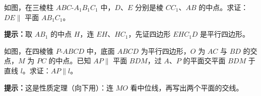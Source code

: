 \documentclass{exam-zh}
\begin{document}

\begin{problem}[points=11]
  \noindent
  \begin{minipage}[t]{\dimexpr\linewidth-60mm-6mm\relax}
    \vspace{0pt}
    如图，在三棱柱 $ABC$-$A_{1}B_{1}C_{1}$ 中，$D$、$E$ 分别是棱 $CC_{1}$、$AB$ 的中点。求证：$DE\parallel$ 平面 $AB_{1}C_{1}$。

    \begin{hintbox}
\textbf{提示：}取 $AB_{1}$ 的中点 $H$，连 $EH$、$HC_{1}$，先证四边形 $EHC_{1}D$ 是平行四边形。\end{hintbox}

  \end{minipage}\hfill
  \begin{diagramcoltikz}{60mm}{取 $H$ 为 $AB_{1}$ 中点，证 $EHC_{1}D$ 为平行四边形。}
  }
  \end{diagramcoltikz}
  \par\medskip
  \answerarea[65mm]
\end{problem}



\begin{problem}[points=11]
  \noindent
  \begin{minipage}[t]{\dimexpr\linewidth-60mm-6mm\relax}
    \vspace{0pt}
    如图，在四棱锥 $P$-$ABCD$ 中，底面 $ABCD$ 为平行四边形，$O$ 为 $AC$ 与 $BD$ 的交点，$M$ 为 $PC$ 的中点。已知 $AP\parallel$ 平面 $BDM$，过 $A$、$P$ 的平面交平面 $BDM$ 于直线 $l$。求证：$AP\parallel l$。

    \begin{hintbox}
\textbf{提示：}这是性质定理（向下用）：连 $MO$ 看中位线，再写出两个平面的交线。\end{hintbox}

  \end{minipage}\hfill
  \begin{diagramcoltikz}{60mm}{$MO$ 是 $\triangle PAC$ 的中位线，$MO\parallel AP$ 且在面 $BDM$ 内。}
  }
  \end{diagramcoltikz}
  \par\medskip
  \answerarea[60mm]
\end{problem}
\end{document}
